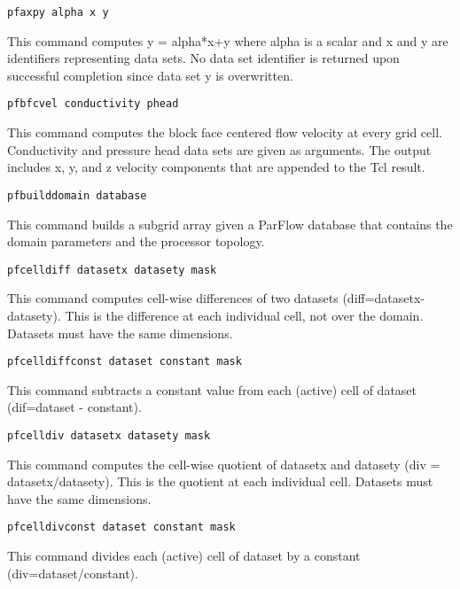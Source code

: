 \begin{description}

\item{\begin{verbatim}pfaxpy alpha x y\end{verbatim}}
This command computes y = alpha*x+y where alpha is a scalar and x and y are identifiers 
representing data sets. No data set identifier is returned upon successful completion 
since data set y is overwritten.

\item{\begin{verbatim}pfbfcvel conductivity phead\end{verbatim}}
This command computes the block face centered flow velocity at every grid cell. 
Conductivity and pressure head data sets are given as arguments.   
The output includes x, y, and z velocity components that are appended to the Tcl result.

\item{\begin{verbatim}pfbuilddomain database\end{verbatim}}
This command builds a subgrid array given a ParFlow database that contains the domain 
parameters and the processor topology. 

\item{\begin{verbatim}pfcelldiff datasetx datasety mask\end{verbatim}}
This command computes cell-wise differences of two datasets (diff=datasetx-datasety). 
This is the difference at each individual cell, not over the domain. Datasets must have the same dimensions.

\item{\begin{verbatim}pfcelldiffconst dataset constant mask\end{verbatim}}
This command subtracts a constant value from each (active) cell of dataset (dif=dataset - constant).

\item{\begin{verbatim}pfcelldiv datasetx datasety mask\end{verbatim}}
This command computes the cell-wise quotient of datasetx and datasety (div = datasetx/datasety).
This is the quotient at each individual cell. Datasets must have the same dimensions.

\item{\begin{verbatim}pfcelldivconst dataset constant mask\end{verbatim}}
This command divides each (active) cell of dataset by a constant (div=dataset/constant). 


\end{description}
